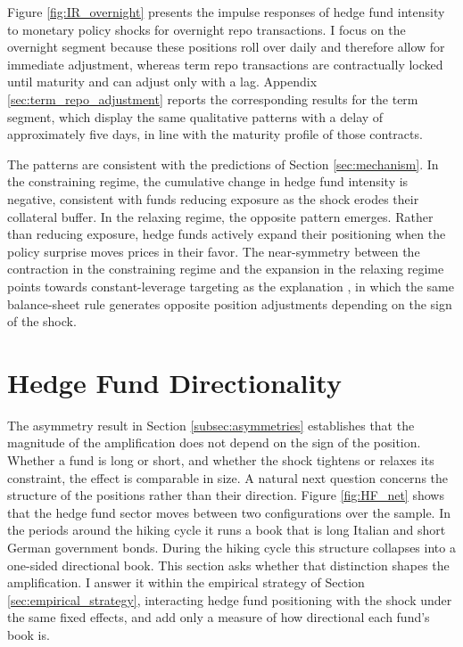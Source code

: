 \documentclass[english, 11pt, oneside]{article}
\begin{document}
Figure \ref{fig:IR_overnight} presents the impulse responses of hedge fund intensity to monetary policy shocks for overnight repo transactions. I focus on the overnight segment because these positions roll over daily and therefore allow for immediate adjustment, whereas term repo transactions are contractually locked until maturity and can adjust only with a lag. Appendix \ref{sec:term_repo_adjustment} reports the corresponding results for the term segment, which display the same qualitative patterns with a delay of approximately five days, in line with the maturity profile of those contracts.

The patterns are consistent with the predictions of Section \ref{sec:mechanism}. In the constraining regime, the cumulative change in hedge fund intensity is negative, consistent with funds reducing exposure as the shock erodes their collateral buffer. In the relaxing regime, the opposite pattern emerges. Rather than reducing exposure, hedge funds actively expand their positioning when the policy surprise moves prices in their favor. The near-symmetry between the contraction in the constraining regime and the expansion in the relaxing regime points towards constant-leverage targeting as the explanation \citep{adrian2014}, in which the same balance-sheet rule generates opposite position adjustments depending on the sign of the shock.

\section{Hedge Fund Directionality}
\label{sec:directionality}

The asymmetry result in Section \ref{subsec:asymmetries} establishes that the magnitude of the amplification does not depend on the sign of the position. Whether a fund is long or short, and whether the shock tightens or relaxes its constraint, the effect is comparable in size. A natural next question concerns the structure of the positions rather than their direction. Figure \ref{fig:HF_net} shows that the hedge fund sector moves between two configurations over the sample. In the periods around the hiking cycle it runs a book that is long Italian and short German government bonds. During the hiking cycle this structure collapses into a one-sided directional book. This section asks whether that distinction shapes the amplification. I answer it within the empirical strategy of Section \ref{sec:empirical_strategy}, interacting hedge fund positioning with the shock under the same fixed effects, and add only a measure of how directional each fund's book is.
\end{document}
